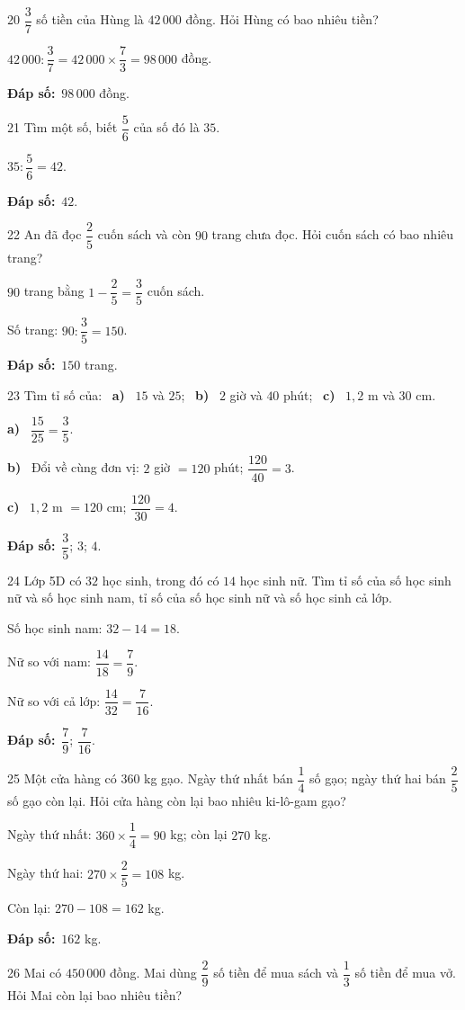 \documentclass[11pt]{article}
\newif\ifsol \solfalse
\providecommand{\AnsWord}{Đáp số}
\newcommand{\dapso}[1]{\par\textbf{\AnsWord:}\ #1}
\newcommand{\probsol}[1]{%
  \begin{lrbox}{\solmeasure}\begin{minipage}{\dimexpr\linewidth-24pt\relax}#1\end{minipage}\end{lrbox}%
  \ifsol
    \begin{solbox}#1\end{solbox}%
  \else
    \setlength{\solht}{\dimexpr\ht\solmeasure+\dp\solmeasure+0.85cm\relax}%
    \ifdim\solht<1.35cm\setlength{\solht}{1.35cm}\fi
    \begin{tcolorbox}[colback=white,colframe=Line,boxrule=0.8pt,arc=5pt,
      left=8pt,right=8pt,top=4pt,bottom=4pt,height=\solht]{\footnotesize\color{Slate}\itshape\WorkWord}\end{tcolorbox}%
  \fi}
\newcommand{\pa}[1]{\textbf{#1)}\ }
\newcommand{\gap}{\vspace{0.3cm}}
\def\WorkWord{Bài làm:}
\def\AnsWord{Đáp số}
\begin{document}
\gap
\begin{probbox}{20}{\relax}
$\dfrac37$ số tiền của Hùng là $42\,000$ đồng. Hỏi Hùng có bao nhiêu tiền?
\end{probbox}
\probsol{
$42\,000:\dfrac37=42\,000\times\dfrac73=98\,000$ đồng.
\dapso{$98\,000$ đồng.}}
\gap
\begin{probbox}{21}{\relax}
Tìm một số, biết $\dfrac56$ của số đó là $35$.
\end{probbox}
\probsol{
$35:\dfrac56=42$.
\dapso{$42$.}}
\gap
\begin{probbox}{22}{\relax}
An đã đọc $\dfrac25$ cuốn sách và còn $90$ trang chưa đọc. Hỏi cuốn sách có bao nhiêu trang?
\end{probbox}
\probsol{
$90$ trang bằng $1-\dfrac25=\dfrac35$ cuốn sách.\par Số trang: $90:\dfrac35=150$.
\dapso{$150$ trang.}}
\gap
\begin{probbox}{23}{\relax}
Tìm tỉ số của: \ \pa{a} $15$ và $25$; \ \pa{b} $2$ giờ và $40$ phút; \ \pa{c} $1{,}2$ m và $30$ cm.
\end{probbox}
\probsol{
\pa{a} $\dfrac{15}{25}=\dfrac35$.\par \pa{b} Đổi về cùng đơn vị: $2$ giờ $=120$ phút; $\dfrac{120}{40}=3$.\par \pa{c} $1{,}2$ m $=120$ cm; $\dfrac{120}{30}=4$.
\dapso{$\dfrac35$; $3$; $4$.}}
\gap
\begin{probbox}{24}{\relax}
Lớp 5D có $32$ học sinh, trong đó có $14$ học sinh nữ. Tìm tỉ số của số học sinh nữ và số học sinh nam, tỉ số của số học sinh nữ và số học sinh cả lớp.
\end{probbox}
\probsol{
Số học sinh nam: $32-14=18$.\par Nữ so với nam: $\dfrac{14}{18}=\dfrac79$.\par Nữ so với cả lớp: $\dfrac{14}{32}=\dfrac7{16}$.
\dapso{$\dfrac79$; $\dfrac7{16}$.}}
\gap
\begin{probbox}{25}{\relax}
Một cửa hàng có $360$ kg gạo. Ngày thứ nhất bán $\dfrac14$ số gạo; ngày thứ hai bán $\dfrac25$ số gạo còn lại. Hỏi cửa hàng còn lại bao nhiêu ki-lô-gam gạo?
\end{probbox}
\probsol{
Ngày thứ nhất: $360\times\dfrac14=90$ kg; còn lại $270$ kg.\par Ngày thứ hai: $270\times\dfrac25=108$ kg.\par Còn lại: $270-108=162$ kg.
\dapso{$162$ kg.}}
\gap
\begin{probbox}{26}{\relax}
Mai có $450\,000$ đồng. Mai dùng $\dfrac29$ số tiền để mua sách và $\dfrac13$ số tiền để mua vở. Hỏi Mai còn lại bao nhiêu tiền?
\end{probbox}
\end{document}
